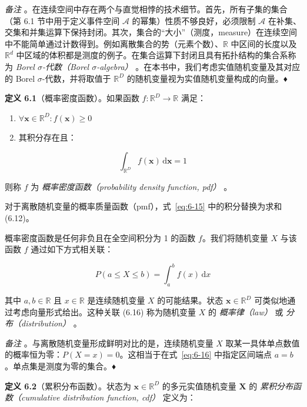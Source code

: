 \emph{备注} 。在连续空间中存在两个与直觉相悖的技术细节。首先，所有子集的集合（第 6.1 节中用于定义事件空间 $ \mathcal{A} $ 的幂集）性质不够良好，必须限制 $ \mathcal{A} $ 在补集、交集和并集运算下保持封闭。其次，集合的“大小”（测度，measure）在连续空间中不能简单通过计数得到。例如离散集合的势（元素个数）、$ \mathbb{R} $ 中区间的长度以及 $ \mathbb{R}^d $ 中区域的体积都是测度的例子。在集合运算下封闭且具有拓扑结构的集合系称为 \emph{Borel $ \sigma $-代数（Borel $ \sigma $-algebra）} 。在本书中，我们考虑实值随机变量及其对应的 Borel $ \sigma $-代数，并将取值于 $ \mathbb{R}^D $ 的随机变量视为实值随机变量构成的向量。♦

\textbf{定义 6.1}（概率密度函数）。如果函数 $ f : \mathbb{R}^D \to \mathbb{R} $ 满足：

\begin{enumerate}
\item $ \forall \boldsymbol{x} \in \mathbb{R}^D : f(\boldsymbol{x}) \geqslant 0 $
\item 其积分存在且：
\end{enumerate}

\begin{equation}
\int_{\mathbb{R}^D} f(\boldsymbol{x})\,\mathrm{d}\boldsymbol{x} = 1
\tag{6.15}\label{eq:6-15}
\end{equation}

则称 $ f $ 为 \emph{概率密度函数（probability density function, pdf）} 。

对于离散随机变量的概率质量函数（pmf），式~\eqref{eq:6-15} 中的积分替换为求和 (6.12)。

概率密度函数是任何非负且在全空间积分为 1 的函数 $ f $。我们将随机变量 $ X $ 与该函数 $ f $ 通过如下方式相关联：

\begin{equation}
P(a \leqslant X \leqslant b) = \int_a^b f(x)\,\mathrm{d}x
\tag{6.16}\label{eq:6-16}
\end{equation}

其中 $ a, b \in \mathbb{R} $ 且 $ x \in \mathbb{R} $ 是连续随机变量 $ X $ 的可能结果。状态 $ \boldsymbol{x} \in \mathbb{R}^D $ 可类似地通过考虑向量形式给出。这种关联 (6.16) 称为随机变量 $ X $ 的 \emph{概率律（law）} 或 \emph{分布（distribution）} 。

\emph{备注} 。与离散随机变量形成鲜明对比的是，连续随机变量 $ X $ 取某一具体单点数值的概率恒为零：$ P(X = x) = 0 $。这相当于在式~\eqref{eq:6-16} 中指定区间端点 $ a = b $。单点集是测度为零的集合。♦

\textbf{定义 6.2}（累积分布函数）。状态为 $ \boldsymbol{x} \in \mathbb{R}^D $ 的多元实值随机变量 $ \boldsymbol{X} $ 的 \emph{累积分布函数（cumulative distribution function, cdf）} 定义为：

